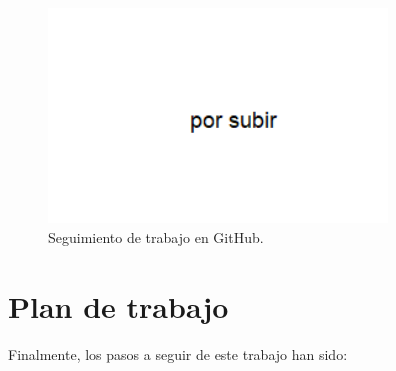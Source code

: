 \begin{itemize}
	\begin{figure}[ht]
	  \begin{center}
	    \includegraphics[width=9cm]{figs/objetivos/github.png}
	  \end{center}
	  \caption{Seguimiento de trabajo en GitHub.}
	  \label{github}
	\end{figure}

\end{itemize}

\clearpage

\section{Plan de trabajo}
\label{sec:plantrabajo}

Finalmente, los pasos a seguir de este trabajo han sido:

